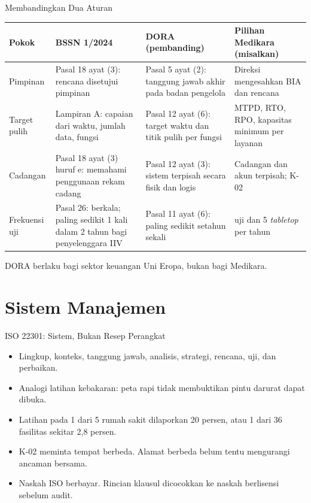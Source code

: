 \documentclass[aspectratio=169, table, 12pt]{beamer}
\begin{document}
\begin{frame}{{\Large Membandingkan Dua Aturan}}
  \vspace{2pt}
  \scriptsize
  \begin{tabularx}{\textwidth}{|>{\raggedright\arraybackslash}p{}|>{\raggedright\arraybackslash}X|>{\raggedright\arraybackslash}X|>{\raggedright\arraybackslash}X|}
    \hline
    \textbf{Pokok} & \textbf{BSSN 1/2024} & \textbf{DORA (pembanding)} & \textbf{Pilihan Medikara
    (misalkan)} \\ \hline
    Pimpinan & Pasal 18 ayat (3): rencana disetujui pimpinan & Pasal 5 ayat (2): tanggung jawab
    akhir pada badan pengelola & Direksi mengesahkan BIA dan rencana \\ \hline
    Target pulih & Lampiran A: capaian dari waktu, jumlah data, fungsi & Pasal 12 ayat (6): target
    waktu dan titik pulih per fungsi & MTPD, RTO, RPO, kapasitas minimum per layanan \\ \hline
    Cadangan & Pasal 18 ayat (3) huruf e: memahami penggunaan rekam cadang & Pasal 12 ayat (3):
    sistem terpisah secara fisik dan logis & Cadangan dan akun terpisah; K-02 \\ \hline
    Frekuensi uji & Pasal 26: berkala; paling sedikit 1 kali dalam 2 tahun bagi penyelenggara IIV &
    Pasal 11 ayat (6): paling sedikit setahun sekali & 144 uji dan 5 \textit{tabletop} per tahun \\
    \hline
  \end{tabularx}

  \vspace{6pt}
  \small DORA berlaku bagi sektor keuangan Uni Eropa, bukan bagi Medikara.
\end{frame}

\section{Sistem Manajemen}

\begin{frame}{{\Large ISO 22301: Sistem, Bukan Resep Perangkat}}
  \vspace{6pt}
  \small
  \begin{itemize}
    \item Lingkup, konteks, tanggung jawab, analisis, strategi, rencana, uji, dan perbaikan.
    \item Analogi latihan kebakaran: peta rapi tidak membuktikan pintu darurat dapat dibuka.
    \item Latihan pada 1 dari 5 rumah sakit dilaporkan 20 persen, atau 1 dari 36 fasilitas sekitar
          2,8 persen.
    \item K-02 meminta tempat berbeda. Alamat berbeda belum tentu mengurangi ancaman bersama.
    \item Naskah ISO berbayar. Rincian klausul dicocokkan ke naskah berlisensi sebelum audit.
  \end{itemize}
\end{frame}
\end{document}
